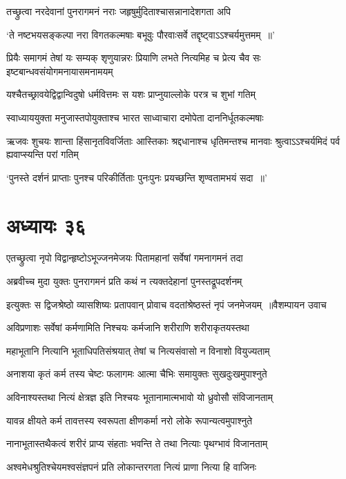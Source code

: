 \twolineshloka
{तच्छ्रुत्वा नरदेवानां पुनरागमनं नराः}
{जहृषुर्मुदिताश्चासन्नानादेशगता अपि}


\twolineshloka
{`ते नष्टभयसङ्कल्पा नरा विगतकल्मषाः}
{बभूवुः पौरवाःसर्वे तद्दृष्ट्वाऽऽश्चर्यमुत्तमम् ॥'}


\threelineshloka
{प्रियैः समागमं तेषां यः सम्यक् शृणुयान्नरः}
{प्रियाणि लभते नित्यमिह च प्रेत्य चैव सः}
{इष्टबान्धवसंयोगमनायासमनामयम्}


\twolineshloka
{यश्चैतच्छ्रावयेद्विद्वान्विदुषो धर्मवित्तमः}
{स यशः प्राप्नुयाल्लोके परत्र च शुभां गतिम्}


\twolineshloka
{स्वाध्याययुक्ता मनुजास्तपोयुक्ताश्च भारत}
{साध्वाचारा दमोपेता दाननिर्धूतकल्मषाः}


\threelineshloka
{ऋजवः शुचयः शान्ता हिंसानृतविवर्जिताः}
{आस्तिकाः श्रद्दधानाश्च धृतिमन्तश्च मानवाः}
{श्रुत्वाऽऽश्चर्यमिदं पर्व ह्यवाप्स्यन्ति परां गतिम्}


\twolineshloka
{`पुनस्ते दर्शनं प्राप्ताः पुनश्च परिकीर्तिताः}
{पुनःपुनः प्रयच्छन्ति शृण्वतामभयं सदा ॥'}


\chapter{अध्यायः ३६}
\twolineshloka
{एतच्छ्रुत्वा नृपो विद्वान्हृष्टोऽभूज्जनमेजयः}
{पितामहानां सर्वेषां गमनागमनं तदा}


\twolineshloka
{अब्रवीच्च मुदा युक्तः पुनरागमनं प्रति}
{कथं न त्यक्तदेहानां पुनस्तद्रूपदर्शनम्}


\threelineshloka
{इत्युक्तः स द्विजश्रेष्ठो व्यासशिष्यः प्रतापवान्}
{प्रोवाच वदतांश्रेष्ठस्तं नृपं जनमेजयम् ॥वैशम्पायन उवाच}
{}


\twolineshloka
{अविप्रणाशः सर्वेषां कर्मणामिति निश्चयः}
{कर्मजानि शरीराणि शरीराकृतयस्तथा}


\twolineshloka
{महाभूतानि नित्यानि भूताधिपतिसंश्रयात्}
{तेषां च नित्यसंवासो न विनाशो वियुज्यताम्}


\twolineshloka
{अनाशया कृतं कर्म तस्य चेष्टः फलागमः}
{आत्मा चैभिः समायुक्तः सुखदुःखमुपाश्नुते}


\twolineshloka
{अविनाश्यस्तथा नित्यं क्षेत्रज्ञ इति निश्चयः}
{भूतानामात्मभावो यो ध्रुवोसौ संविजानताम्}


\twolineshloka
{यावन्न क्षीयते कर्म तावत्तस्य स्वरूपता}
{क्षीणकर्मा नरो लोके रूपान्यत्वमुपाश्नुते}


\twolineshloka
{नानाभूतास्तथैकत्वं शरीरं प्राप्य संहताः}
{भवन्ति ते तथा नित्याः पृथग्भावं विजानताम्}


\twolineshloka
{अश्वमेधश्रुतिश्चेयमश्वसंज्ञपनं प्रति}
{लोकान्तरगता नित्यं प्राणा नित्या हि वाजिनः}


